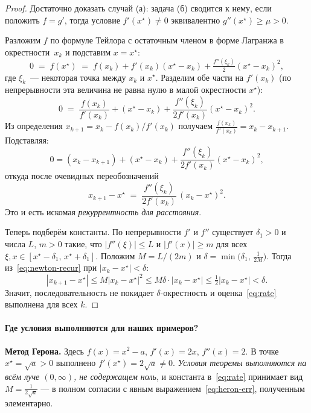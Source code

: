 \begin{proof}
Достаточно доказать случай (а): задача (б) сводится к нему,
если положить $f=g'$, тогда условие $f'(x^{\star})\neq 0$
эквивалентно $g''(x^{\star})\geq\mu>0$.

Разложим $f$ по формуле Тейлора с остаточным членом в форме
Лагранжа в окрестности~$x_k$ и подставим $x=x^{\star}$:
\[
0\;=\;f(x^{\star})\;=\;f(x_k)+f'(x_k)(x^{\star}-x_k)+\tfrac{f''(\xi_k)}{2}(x^{\star}-x_k)^{2},
\]
где $\xi_k$~— некоторая точка между $x_k$ и $x^{\star}$. Разделим
обе части на $f'(x_k)$ (по непрерывности эта величина не равна
нулю в малой окрестности $x^{\star}$):
\[
0\;=\;\dfrac{f(x_k)}{f'(x_k)}+(x^{\star}-x_k)+\dfrac{f''(\xi_k)}{2 f'(x_k)}(x^{\star}-x_k)^{2}.
\]
Из определения $x_{k+1}=x_k-f(x_k)/f'(x_k)$ получаем
$\frac{f(x_k)}{f'(x_k)}=x_k-x_{k+1}$. Подставляя:
\[
0=(x_k-x_{k+1})+(x^{\star}-x_k)+\dfrac{f''(\xi_k)}{2 f'(x_k)}(x^{\star}-x_k)^{2},
\]
откуда после очевидных переобозначений
\begin{equation}\label{eq:newton-recur}
x_{k+1}-x^{\star}\;=\;\dfrac{f''(\xi_k)}{2 f'(x_k)}\,(x_k-x^{\star})^{2}.
\end{equation}
Это и есть искомая \emph{рекуррентность для расстояния}.

Теперь подберём константы. По непрерывности $f'$ и $f''$ существует
$\delta_1>0$ и числа $L$, $m>0$ такие, что
$|f''(\xi)|\leq L$ и $|f'(x)|\geq m$ для всех $\xi,x\in
[x^{\star}-\delta_1,\,x^{\star}+\delta_1]$.
Положим $M=L/(2m)$ и $\delta=\min\!\bigl(\delta_1,\,\tfrac{1}{2M}\bigr)$.
Тогда из~\eqref{eq:newton-recur} при $|x_k-x^{\star}|<\delta$:
\[
|x_{k+1}-x^{\star}|\leq M|x_k-x^{\star}|^{2}\leq M\delta\cdot|x_k-x^{\star}|\leq\tfrac12|x_k-x^{\star}|<\delta.
\]
Значит, последовательность не покидает $\delta$-окрестность и
оценка~\eqref{eq:rate} выполнена для всех $k$.
\end{proof}

\paragraph{Где условия выполняются для наших примеров?}

\textbf{Метод Герона.} Здесь $f(x)=x^{2}-a$, $f'(x)=2x$,
$f''(x)=2$. В точке $x^{\star}=\sqrt{a}>0$ выполнено $f'(x^{\star})=2\sqrt{a}\neq 0$.
\emph{Условия теоремы выполняются на всём луче $(0,\infty)$,
не содержащем ноль}, и константа в~\eqref{eq:rate} принимает вид
$M=\frac{1}{2\sqrt{a}}$ — в полном согласии с
явным выражением~\eqref{eq:heron-err}, полученным элементарно.

